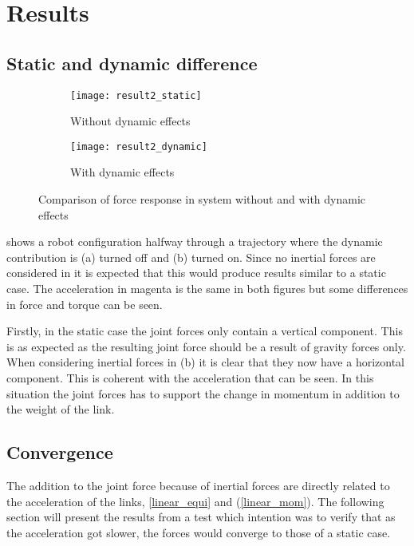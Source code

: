 \chapter{Results}

\section{Static and dynamic difference}

\begin{figure}[h!]
\begin{subfigure}[b]{0.5\textwidth}
    \centering
    \texttt{[image: result2\_static]}
    \caption{Without dynamic effects}
    \label{result_static}
\end{subfigure}
\hfill
\begin{subfigure}[b]{0.5\textwidth}
    \centering
    \texttt{[image: result2\_dynamic]}
    \caption{With dynamic effects}
\end{subfigure}
\caption{Comparison of force response in system without and with dynamic effects}
\label{result_img}
\end{figure}

 shows a robot configuration halfway through a trajectory where the dynamic contribution is (a) turned off and (b) turned on. Since no inertial forces are considered in  it is expected that this would produce results similar to a static case. The acceleration in magenta is the same in both figures but some differences in force and torque can be seen.

Firstly, in the static case the joint forces only contain a vertical component. This is as expected as the resulting joint force should be a result of gravity forces only. When considering inertial forces in (b) it is clear that they now have a horizontal component. This is coherent with the acceleration that can be seen. In this situation the joint forces has to support the change in momentum in addition to the weight of the link.

\section{Convergence}

The addition to the joint force because of inertial forces are directly related to the acceleration of the links,  \eqref{linear_equi} and (\ref{linear_mom}). The following section will present the results from a test which intention was to verify that as the acceleration got slower, the forces would converge to those of a static case.

